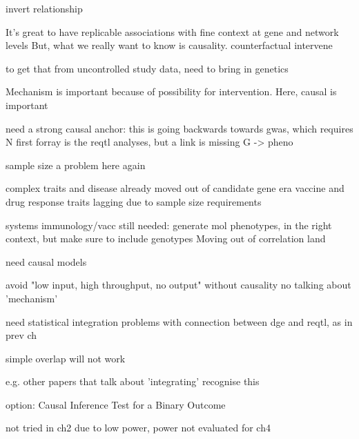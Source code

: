 \begin{outline}
invert relationship

It's great to have replicable associations with fine context at gene and network levels 
    But, what we really want to know is causality. 
    counterfactual
    intervene

    to get that from uncontrolled study data, need to bring in genetics

    Mechanism is important because of possibility for intervention. Here, causal is important

    need a strong causal anchor: this is going backwards towards gwas, which requires N
        first forray is the reqtl analyses, but a link is missing
        G -> pheno

        sample size a problem here again

            complex traits and disease already moved out of candidate gene era
            vaccine and drug response traits lagging due to sample size requirements

        systems immunology/vacc still needed: generate mol phenotypes, in the right context,
        but make sure to include genotypes
        Moving out of correlation land

    need causal models

        avoid "low input, high throughput, no output"
        without causality no talking about 'mechanism'

    need statistical integration
        problems with connection between dge and reqtl, as in prev ch

        simple overlap will not work

            e.g. other papers that talk about 'integrating' recognise this

    option:
        Causal Inference Test for a Binary Outcome

            not tried in ch2 due to low power, power not evaluated for ch4


\end{outline}
